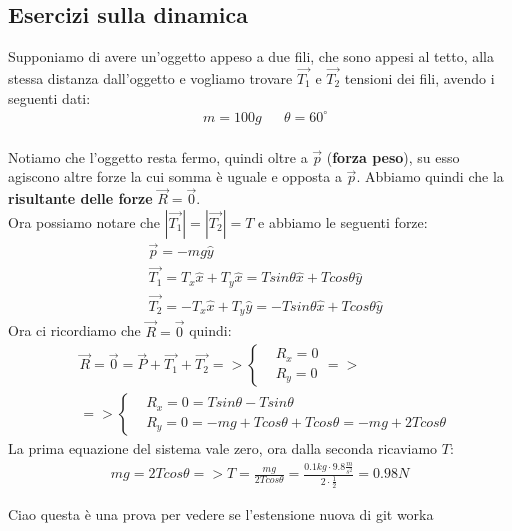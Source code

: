   \subsection{Esercizi sulla dinamica}
    Supponiamo di avere un'oggetto appeso a due fili, che sono appesi al tetto, alla stessa distanza dall'oggetto e vogliamo trovare $\vec{T_1}$ e $\vec{T_2}$ tensioni dei fili, avendo i seguenti dati:
    \begin{align*}
      &m=100g&&\theta=60^{\circ}\\
    \end{align*}


    Notiamo che l'oggetto resta fermo, quindi oltre a $\vec{p}$ (\textbf{forza peso}), su esso agiscono altre forze la cui somma è uguale e opposta a $\vec{p}$. Abbiamo quindi che la \textbf{risultante delle forze} $\vec{R}=\vec{0}$.\\
    Ora possiamo notare che $|\vec{T_1}|=|\vec{T_2}|=T$ e abbiamo le seguenti forze:
    \begin{align*}
      &\vec{p}=-mg\hat{y}\\
      &\vec{T_1}=T_x\hat{x}+T_y\hat{x}=Tsin\theta \hat{x}+Tcos\theta \hat{y}\\
      &\vec{T_2}=-T_x\hat{x}+T_y\hat{y}=-Tsin\theta \hat{x}+Tcos\theta \hat{y}
    \end{align*}
    Ora ci ricordiamo che $\vec{R}=\vec{0}$ quindi:
    \begin{align*}
      &\vec{R}=\vec{0}=\vec{P}+\vec{T_1}+\vec{T_2}=>
      \begin{cases}
        &R_x=0\\
        &R_y=0
      \end{cases}=>\\
      &=>\begin{cases}
        &R_x=0=Tsin\theta-Tsin\theta\\
        &R_y=0=-mg+Tcos\theta+Tcos\theta=-mg+2Tcos\theta
      \end{cases}
    \end{align*}
    La prima equazione del sistema vale zero, ora dalla seconda ricaviamo $T$:
    \begin{align*}
    mg=2Tcos\theta=>T=\frac{mg}{2Tcos\theta}=\frac{0.1kg\cdot 9.8\frac{m}{s^2}}{2\cdot\frac{1}{2}}=0.98N
    \end{align*}

    Ciao questa è una prova per vedere se l'estensione nuova di git worka

